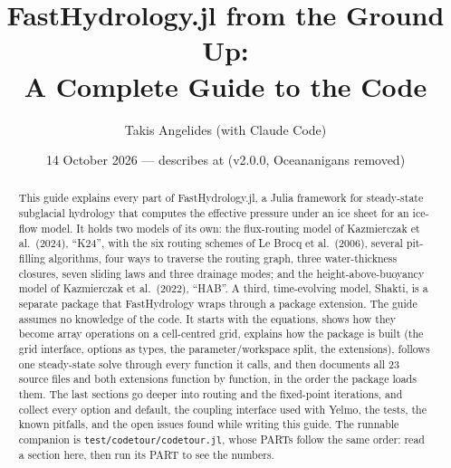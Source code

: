 \documentclass[11pt]{article}
\title{FastHydrology.jl from the Ground Up:\\ A Complete Guide to the Code}
\author{Takis Angelides (with Claude Code)}
\date{14 October 2026 --- describes \code{main} at \code{c88bd23} (v2.0.0, Oceananigans removed)}
\DeclareRobustCommand{\_}{\ifmmode\text{\textunderscore}\else\textunderscore\allowbreak\fi}
\newcommand{\code}[1]{\texttt{#1}}
\begin{document}
\sloppy
\maketitle

\begin{abstract}
This guide explains every part of FastHydrology.jl, a Julia framework for steady-state subglacial hydrology
that computes the effective pressure under an ice sheet for an ice-flow model. It holds two models of its own:
the flux-routing model of Kazmierczak et al.\ (2024), ``K24'', with the six routing schemes of Le Brocq et al.\
(2006), several pit-filling algorithms, four ways to traverse the routing graph, three water-thickness closures,
seven sliding laws and three drainage modes; and the height-above-buoyancy model of Kazmierczak et al.\ (2022),
``HAB''. A third, time-evolving model, Shakti, is a separate package that FastHydrology wraps through a package
extension. The guide assumes no knowledge of the code. It starts with the equations, shows how they become array
operations on a cell-centred grid, explains how the package is built (the grid interface, options as types,
the parameter/workspace split, the extensions), follows one steady-state solve through every function it calls,
and then documents all 23 source files and both extensions function by function, in the order the package loads
them. The last sections go deeper into routing and the fixed-point iterations, and collect every option and
default, the coupling interface used with Yelmo, the tests, the known pitfalls, and the open issues found while
writing this guide. The runnable companion is \code{test/code\_tour/code\_tour.jl}, whose PARTs follow the
same order: read a section here, then run its PART to see the numbers.
\end{abstract}

\tableofcontents
\clearpage











\appendix

\end{document}
